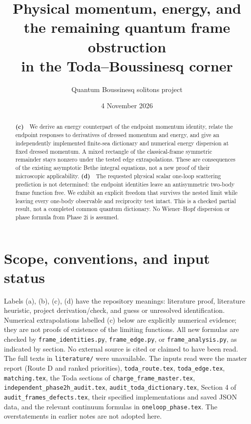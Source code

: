 \documentclass[11pt,a4paper]{article}
\title{Physical momentum, energy, and the remaining quantum frame obstruction\\in the Toda--Boussinesq corner}
\author{Quantum Boussinesq solitons project}
\date{4 November 2026}
\newcommand{\Lc}{\textbf{(c)}\ }
\newcommand{\Ld}{\textbf{(d)}\ }
\newcommand{\id}{\texttt{frame\_\allowbreak identities.py}}
\newcommand{\ed}{\texttt{frame\_\allowbreak edge.py}}
\newcommand{\an}{\texttt{frame\_\allowbreak analysis.py}}
\begin{document}
\maketitle
\begin{abstract}
\Lc\ We derive an energy counterpart of the endpoint momentum identity,
relate the endpoint responses to derivatives of dressed momentum and energy,
and give an independently implemented finite-sea dictionary and numerical
energy dispersion at fixed dressed momentum. A mixed rectangle of the
classical-frame symmetric remainder stays nonzero under the tested edge
extrapolations. These are consequences of the existing asymptotic Bethe
integral equations, not a new proof of their microscopic applicability.
\Ld\ The requested physical scalar one-loop scattering prediction is not
determined: the endpoint identities leave an antisymmetric two-body frame
function free. We exhibit an explicit freedom that survives the nested
limit while leaving every one-body observable and reciprocity test intact.
This is a checked partial result, not a completed common quantum dictionary.
No Wiener--Hopf dispersion or phase formula from Phase 2i is assumed.
\end{abstract}

\section{Scope, conventions, and input status}
Labels (a), (b), (c), (d) have the repository meanings: literature proof,
literature heuristic, project derivation/check, and guess or unresolved
identification. Numerical extrapolations labelled (c) below are explicitly
numerical evidence; they are not proofs of existence of the limiting functions.
All new formulas are checked by \id, \ed, or \an, as indicated by section.
No external source is cited or claimed to have been read. The full texts in
\texttt{literature/} were unavailable. The inputs read were the master report
(Route D and ranked priorities), \texttt{toda\_route.tex},
\texttt{toda\_edge.tex}, \texttt{matching.tex}, the Toda sections of
\texttt{charge\_frame\_master.tex}, \texttt{independent\_phase2h\_audit.tex},
\texttt{audit\_toda\_dictionary.tex}, Section 4 of
\texttt{audit\_frames\_defects.tex}, their specified implementations and saved
JSON data, and the relevant continuum formulas in \texttt{oneloop\_phase.tex}.
The overstatements in earlier notes are not adopted here.
\end{document}
